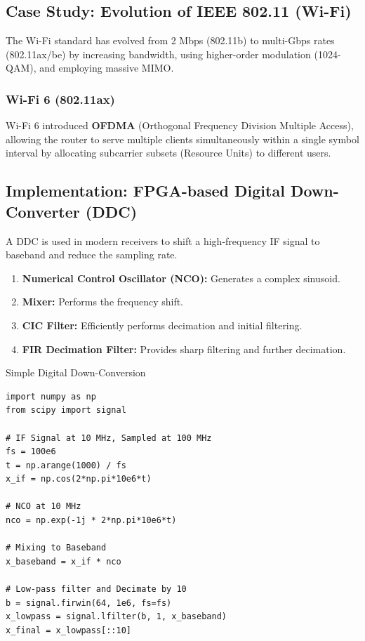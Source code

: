\subsection{Case Study: Evolution of IEEE 802.11 (Wi-Fi)}
The Wi-Fi standard has evolved from 2 Mbps (802.11b) to multi-Gbps rates (802.11ax/be) by increasing bandwidth, using higher-order modulation (1024-QAM), and employing massive MIMO.

\subsubsection{Wi-Fi 6 (802.11ax)}
Wi-Fi 6 introduced \textbf{OFDMA} (Orthogonal Frequency Division Multiple Access), allowing the router to serve multiple clients simultaneously within a single symbol interval by allocating subcarrier subsets (Resource Units) to different users.

\subsection{Implementation: FPGA-based Digital Down-Converter (DDC)}
A DDC is used in modern receivers to shift a high-frequency IF signal to baseband and reduce the sampling rate.
\begin{enumerate}
    \item \textbf{Numerical Control Oscillator (NCO):} Generates a complex sinusoid.
    \item \textbf{Mixer:} Performs the frequency shift.
    \item \textbf{CIC Filter:} Efficiently performs decimation and initial filtering.
    \item \textbf{FIR Decimation Filter:} Provides sharp filtering and further decimation.
\end{enumerate}

\begin{pythonbox}{Simple Digital Down-Conversion}
\begin{verbatim}
import numpy as np
from scipy import signal

# IF Signal at 10 MHz, Sampled at 100 MHz
fs = 100e6
t = np.arange(1000) / fs
x_if = np.cos(2*np.pi*10e6*t)

# NCO at 10 MHz
nco = np.exp(-1j * 2*np.pi*10e6*t)

# Mixing to Baseband
x_baseband = x_if * nco

# Low-pass filter and Decimate by 10
b = signal.firwin(64, 1e6, fs=fs)
x_lowpass = signal.lfilter(b, 1, x_baseband)
x_final = x_lowpass[::10]
\end{verbatim}
\end{pythonbox}

